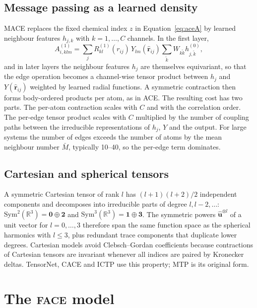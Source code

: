 \documentclass[journal=jctcce,manuscript=article,layout=traditional]{achemso}
\newcommand{\vect}[1]{\bm{#1}}
\newcommand{\FACE}{\textup{\textsc{face}}}
\begin{document}
\subsection{Message passing as a learned density}
MACE\cite{batatia2022mace} replaces the fixed chemical index $z$ in Equation~\ref{eq:aceA} by learned neighbour features
$h_{j,k}$ with $k=1,\dots,C$ channels. In the first layer,
\begin{equation}
A^{(1)}_{i,klm}=\sum_jR^{(1)}_{kl}(r_{ij})\,Y_{lm}(\hat{\vect r}_{ij})\sum_{\tilde k}W_{k\tilde k}h^{(0)}_{j,\tilde k},
\end{equation}
and in later layers the neighbour features $h_j$ are themselves equivariant, so that the edge operation becomes a
channel-wise tensor product between $h_j$ and $Y(\hat{\vect r}_{ij})$ weighted by learned radial functions. A
symmetric contraction then forms body-ordered products per atom, as in ACE. The resulting cost has two parts. The
per-atom contraction scales with $C$ and with the correlation order. The per-edge tensor product scales with
$C$ multiplied by the number of coupling paths between the irreducible representations of $h_j$, $Y$ and the
output. For large systems the number of edges exceeds the number of atoms by the mean neighbour number $\bar M$,
typically 10--40, so the per-edge term dominates.

\subsection{Cartesian and spherical tensors}
A symmetric Cartesian tensor of rank $l$ has $(l+1)(l+2)/2$ independent components and decomposes into irreducible
parts of degree $l, l-2,\dots$: $\mathrm{Sym}^2(\mathbb R^3)=\mathbf 0\oplus\mathbf 2$ and
$\mathrm{Sym}^3(\mathbb R^3)=\mathbf 1\oplus\mathbf 3$. The symmetric powers $\hat{\vect u}^{\otimes l}$ of a unit
vector for $l=0,\dots,3$ therefore span the same function space as the spherical harmonics with $l\le3$, plus
redundant trace components that duplicate lower degrees. Cartesian models avoid Clebsch--Gordan coefficients because
contractions of Cartesian tensors are invariant whenever all indices are paired by Kronecker deltas. TensorNet,
CACE and ICTP use this property; MTP is its original form.

\section{The \FACE{} model}
\label{sec:theory}
\end{document}
